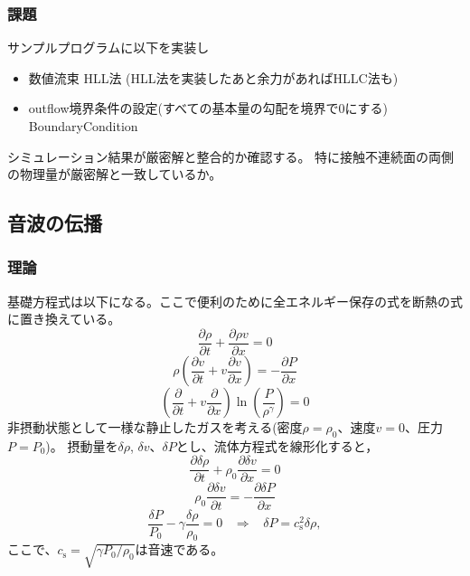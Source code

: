 \subsubsection{課題}

サンプルプログラムに以下を実装し
\begin{itemize}
    \item 数値流束 HLL法 (HLL法を実装したあと余力があればHLLC法も)
    \item outflow境界条件の設定(すべての基本量の勾配を境界で0にする)
    {\ttfamily BoundaryCondition}
\end{itemize}
シミュレーション結果が厳密解と整合的か確認する。
特に接触不連続面の両側の物理量が厳密解と一致しているか。



\newpage
\subsection{音波の伝播}

\subsubsection{理論}

基礎方程式は以下になる。ここで便利のために全エネルギー保存の式を断熱の式に置き換えている。
\begin{equation}
    \frac{\partial \rho}{\partial t} + \frac{\partial \rho v}{\partial x} = 0
\end{equation}
\begin{equation}
    \rho\left(\frac{\partial v}{\partial t} + v\frac{\partial v}{\partial x}\right) =
    - \frac{\partial P}{\partial x} 
\end{equation}
\begin{equation}
   \left(\frac{\partial }{\partial t} + v\frac{\partial }{\partial x}\right)
   \ln \left(\frac{P}{\rho^\gamma}\right) = 0
\end{equation}
非摂動状態として一様な静止したガスを考える(密度$\rho=\rho_0$、速度$v=0$、圧力$P=P_0$)。
摂動量を$\delta \rho$, $\delta v$、$\delta P$とし、流体方程式を線形化すると，
\begin{equation}
    \frac{\partial \delta \rho}{\partial t} + \rho_0 \frac{\partial \delta v}{\partial x} = 0
    \label{eoc_sound}
\end{equation}
\begin{equation}
    \rho_0\frac{\partial \delta v}{\partial t} = 
    - \frac{\partial \delta P}{\partial x} 
    \label{eom_sound}
\end{equation}
\begin{equation}
\frac{\delta P}{P_0} -\gamma \frac{\delta \rho}{\rho_0}  = 0 \;\;\;
\Rightarrow \;\;\; \delta P = c_\mathrm{s}^2 \delta \rho,
    \label{eoe_sound}
\end{equation}
ここで、$c_\mathrm{s}=\sqrt{\gamma P_0/\rho_0}$は音速である。

